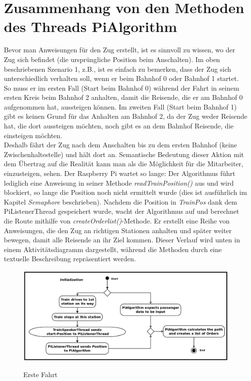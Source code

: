 \section{Zusammenhang von den Methoden des Threads PiAlgorithm}
Bevor man Anweisungen für den Zug erstellt, ist es sinnvoll zu wissen, wo der Zug sich befindet (die ursprüngliche Position beim Anschalten). Im oben beschriebenen Szenario 1, z.B., ist es einfach zu bemerken, dass der Zug sich unterschiedlich verhalten soll, wenn er beim Bahnhof 0 oder Bahnhof 1 startet. So muss er im ersten Fall (Start beim Bahnhof 0) während der Fahrt in seinem ersten Kreis beim Bahnhof 2 anhalten, damit die Reisende, die er am Bahnhof 0 aufgenommen hat, aussteigen können. Im zweiten Fall (Start beim Bahnhof 1) gibt es keinen Grund für das Anhalten am Bahnhof 2, da der Zug weder Reisende hat, die dort aussteigen möchten, noch gibt es an dem Bahnhof Reisende, die einsteigen möchten.\\
Deshalb fährt der Zug nach dem Anschalten bis zu dem ersten Bahnhof (keine Zwischenhaltestelle) und hält dort an. Semantische Bedeutung dieser Aktion mit dem Übertrag auf die Realität kann man als die Möglichkeit für die Mitarbeiter, einzusteigen, sehen. Der Raspberry Pi wartet so lange: Der Algorithmus führt lediglich eine Anweisung in seiner Methode \textit{readTrainPosition()} aus und wird blockiert, so lange die Position noch nicht ermittelt wurde (dies ist ausführlich im Kapitel \textit{Semaphore} beschrieben). Nachdem die Position in \textit{TrainPos} dank dem PiListenerThread gespeichert wurde, wacht der Algorithmus auf und berechnet die Route mithilfe von \textit{createOrderlist()}-Methode. Er erstellt eine Reihe von Anweisungen, die den Zug an richtigen Stationen anhalten und später weiter bewegen, damit alle Reisende an ihr Ziel kommen. Dieser Verlauf wird unten in einem Aktivitätsdiagramm dargestellt, während die Methoden durch eine textuelle Beschreibung repräsentiert werden.\\
\begin{figure}[H]	
\caption{Erste Fahrt}
\includegraphics[width=2\textwidth, width=470pt]{content/images/Act-dia1.png}
\label{pic:init}
\end{figure}

